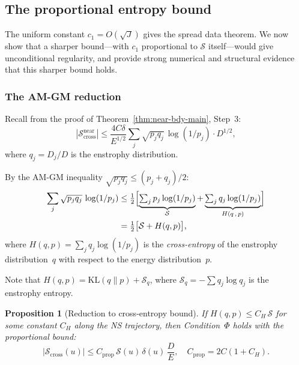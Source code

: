 \documentclass[11pt]{article}
\newtheorem{proposition}[theorem]{Proposition}
\theoremstyle{definition}
\newcommand{\cS}{\mathcal{S}}
\begin{document}
\subsection{The proportional entropy bound}
\label{sec:proportional}

The uniform constant $c_1 = O(\sqrt{J})$ gives the spread
data theorem.  We now show that a sharper bound---with
$c_1$ proportional to $\cS$ itself---would give
unconditional regularity, and provide strong numerical and
structural evidence that this sharper bound holds.


\subsubsection{The AM-GM reduction}

Recall from the proof of Theorem~\ref{thm:near-bdy-main},
Step~3:
\begin{equation}\label{eq:step3-recall}
|\cS_{\mathrm{cross}}^{\mathrm{near}}|
\leq \frac{4C\delta}{E^{1/2}}
\sum_j \sqrt{p_j q_j}\,\log(1/p_j)\cdot D^{1/2},
\end{equation}
where $q_j = D_j/D$ is the enstrophy distribution.

By the AM-GM inequality $\sqrt{p_j q_j}
\leq (p_j + q_j)/2$:
\begin{align}
\sum_j \sqrt{p_j q_j}\,\log(1/p_j)
&\leq \tfrac{1}{2}\Bigl[
\underbrace{\textstyle\sum_j p_j\log(1/p_j)}_{\cS}
+ \underbrace{\textstyle\sum_j q_j\log(1/p_j)}_{H(q\,,\,p)}
\Bigr]
\nonumber\\
&= \tfrac{1}{2}\bigl[\cS + H(q,p)\bigr],
\label{eq:am-gm-bound}
\end{align}
where $H(q,p) = \sum_j q_j\log(1/p_j)$ is the
\emph{cross-entropy} of the enstrophy distribution~$q$
with respect to the energy distribution~$p$.

Note that $H(q,p) = \mathrm{KL}(q\|p) + \cS_q$, where
$\cS_q = -\sum q_j\log q_j$ is the enstrophy entropy.

\begin{proposition}[Reduction to cross-entropy bound]
\label{prop:reduction}
If $H(q,p) \leq C_H\,\cS$ for some constant $C_H$
along the NS trajectory, then Condition~$\Phi$ holds with
the proportional bound:
\begin{equation}\label{eq:proportional}
|\cS_{\mathrm{cross}}(u)|
\leq C_{\mathrm{prop}}\,\cS(u)\,\delta(u)\,\frac{D}{E},
\quad C_{\mathrm{prop}} = 2C(1+C_H).
\end{equation}
\end{proposition}
\end{document}
